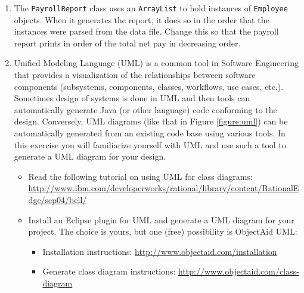 \documentclass[12pt]{scrartcl}
\begin{document}
\begin{enumerate}
  \item The \texttt{PayrollReport} class uses an 
    \texttt{ArrayList} to hold instances of 
    \texttt{Employee} objects.  When it generates the report, 
    it does so in the order that the instances were parsed from the 
    data file.  Change this so that the payroll report prints in order 
    of the total net pay in decreasing order.  
    
  \item Unified Modeling Language (UML) is a common tool in Software
    Engineering that provides a visualization of the relationships 
    between software components (subsystems, components, classes, 
    workflows, use cases, etc.).  Sometimes design of systems is done 
    in UML and then tools can automatically generate Java (or other 
    language) code conforming to the design.  Conversely, UML diagrams 
    (like that in Figure \ref{figure:uml}) can be automatically generated 
    from an existing code base using various tools.  In this exercise 
    you will familiarize yourself with UML and use such a tool to 
    generate a UML diagram for your design.
    \begin{itemize}
      \item Read the following tutorial on using UML for class diagrams:
\url{http://www.ibm.com/developerworks/rational/library/content/RationalEdge/sep04/bell/}
      \item Install an Eclipse plugin for UML and generate a UML diagram 
      for your project.  The choice is yours, but one (free) possibility 
      is ObjectAid UML:
      \begin{itemize}
        \item Installation instructions: 
        \url{http://www.objectaid.com/installation}
	    \item Generate class diagram instructions: 
        \url{http://www.objectaid.com/class-diagram}
      \end{itemize}
    \end{itemize}
\end{enumerate}
\end{document}
